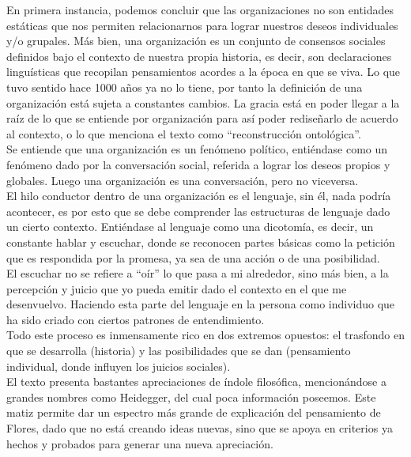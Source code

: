 En primera instancia, podemos concluir que las organizaciones no son entidades est\'aticas
que nos permiten relacionarnos para lograr nuestros deseos individuales y/o grupales. M\'as bien,
una organizaci\'on es un conjunto de consensos sociales definidos bajo el contexto de nuestra propia
historia, es decir, son declaraciones lingu\'isticas que recopilan pensamientos acordes a la \'epoca
en que se viva. Lo que tuvo sentido hace 1000 a\~nos ya no lo tiene, por tanto la definici\'on de una
organizaci\'on est\'a sujeta a constantes cambios. La gracia est\'a en poder llegar a la ra\'iz de lo que se
entiende por organizaci\'on para as\'i poder redise\~narlo de acuerdo al contexto, o lo que menciona el
texto como ``reconstrucci\'on ontol\'ogica''.\\

Se entiende que una organizaci\'on es un fen\'omeno pol\'itico, enti\'endase como un fen\'omeno
dado por la conversaci\'on social, referida a lograr los deseos propios y globales. Luego una organizaci\'on
es una conversaci\'on, pero no viceversa.\\

El hilo conductor dentro de una organizaci\'on es el lenguaje, sin \'el, nada podr\'ia acontecer, es
por esto que se debe comprender las estructuras de lenguaje dado un cierto contexto. Enti\'endase
al lenguaje como una dicotom\'ia, es decir, un constante hablar y escuchar, donde se reconocen partes
b\'asicas como la petici\'on que es respondida por la promesa, ya sea de una acci\'on o de una posibilidad.\\

 El escuchar no se refiere a ``o\'ir'' lo que pasa a mi alrededor, sino m\'as bien, a la percepci\'on y
juicio que yo pueda emitir dado el contexto en el que me desenvuelvo. Haciendo esta parte del
lenguaje en la persona como individuo que ha sido criado con ciertos patrones de entendimiento.\\

Todo este proceso es inmensamente rico en dos extremos opuestos: el trasfondo en que se
desarrolla (historia) y las posibilidades que se dan (pensamiento individual, donde influyen los juicios
 sociales).\\


El texto presenta bastantes apreciaciones de \'indole filos\'ofica, mencion\'andose a grandes
nombres como Heidegger, del cual poca informaci\'on poseemos. Este matiz permite dar un espectro
 m\'as grande de explicaci\'on del pensamiento de Flores, dado que no est\'a creando ideas nuevas,
sino que se apoya en criterios ya hechos y probados para generar una nueva apreciaci\'on.\\

